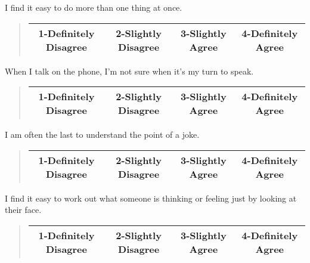 \documentclass[11pt]{article}
\begin{document}
\begin{tcolorbox}
I find it easy to do more than one thing at once.  \\
\begin{quote}
\begin{center}
	\begin{tabular}{|c|c|c|c|}
\hline
		1-Definitely Disagree & 2-Slightly Disagree & 3-Slightly Agree & 4-Definitely Agree\\ \hline
	\end{tabular}
\end{center}
\end{quote}
\end{tcolorbox}
\begin{tcolorbox}
When I talk on the phone, I'm not sure when it's my turn to speak.  \\
\begin{quote}
\begin{center}
	\begin{tabular}{|c|c|c|c|}
\hline
		1-Definitely Disagree & 2-Slightly Disagree & 3-Slightly Agree & 4-Definitely Agree\\ \hline
	\end{tabular}
\end{center}
\end{quote}
\end{tcolorbox}
\begin{tcolorbox}
I am often the last to understand the point of a joke. \\
\begin{quote}
\begin{center}
	\begin{tabular}{|c|c|c|c|}
\hline
		1-Definitely Disagree & 2-Slightly Disagree & 3-Slightly Agree & 4-Definitely Agree\\ \hline
	\end{tabular}
\end{center}
\end{quote}
\end{tcolorbox}
\begin{tcolorbox} 
I find it easy to work out what someone is thinking or feeling just by looking at their face.  \\
\begin{quote}
\begin{center}
	\begin{tabular}{|c|c|c|c|}
\hline
		1-Definitely Disagree & 2-Slightly Disagree & 3-Slightly Agree & 4-Definitely Agree\\ \hline
	\end{tabular}
\end{center}
\end{quote}
\end{tcolorbox}
\end{document}
